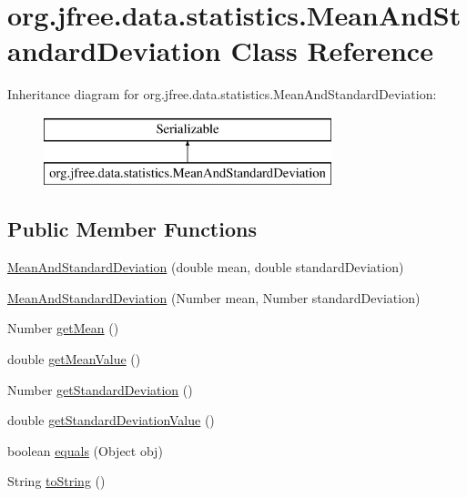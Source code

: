 \hypertarget{classorg_1_1jfree_1_1data_1_1statistics_1_1_mean_and_standard_deviation}{}\section{org.\+jfree.\+data.\+statistics.\+Mean\+And\+Standard\+Deviation Class Reference}
\label{classorg_1_1jfree_1_1data_1_1statistics_1_1_mean_and_standard_deviation}
Inheritance diagram for org.\+jfree.\+data.\+statistics.\+Mean\+And\+Standard\+Deviation\+:\begin{figure}[H]
\begin{center}
\leavevmode
\includegraphics[height=2.000000cm]{classorg_1_1jfree_1_1data_1_1statistics_1_1_mean_and_standard_deviation}
\end{center}
\end{figure}
\subsection*{Public Member Functions}
\begin{DoxyCompactItemize}
\item 
\mbox{\hyperlink{classorg_1_1jfree_1_1data_1_1statistics_1_1_mean_and_standard_deviation_ac1fd9028a4b27e628e6b0c10f63ccd5f}{Mean\+And\+Standard\+Deviation}} (double mean, double standard\+Deviation)
\item 
\mbox{\hyperlink{classorg_1_1jfree_1_1data_1_1statistics_1_1_mean_and_standard_deviation_a74de958caea0910c4c0d18f62108f490}{Mean\+And\+Standard\+Deviation}} (Number mean, Number standard\+Deviation)
\item 
Number \mbox{\hyperlink{classorg_1_1jfree_1_1data_1_1statistics_1_1_mean_and_standard_deviation_a2c1233c0e0fa3ae0307187f122f1fc43}{get\+Mean}} ()
\item 
double \mbox{\hyperlink{classorg_1_1jfree_1_1data_1_1statistics_1_1_mean_and_standard_deviation_af21182a3c89a68ae13833c552feb18d9}{get\+Mean\+Value}} ()
\item 
Number \mbox{\hyperlink{classorg_1_1jfree_1_1data_1_1statistics_1_1_mean_and_standard_deviation_aac392b181dc4e2bdfdd47b7dc6e7ae29}{get\+Standard\+Deviation}} ()
\item 
double \mbox{\hyperlink{classorg_1_1jfree_1_1data_1_1statistics_1_1_mean_and_standard_deviation_a74c3e8989dfc84acedf20eb35849afcf}{get\+Standard\+Deviation\+Value}} ()
\item 
boolean \mbox{\hyperlink{classorg_1_1jfree_1_1data_1_1statistics_1_1_mean_and_standard_deviation_a1525881f5d3fc6576a8b3c55b10eb145}{equals}} (Object obj)
\item 
String \mbox{\hyperlink{classorg_1_1jfree_1_1data_1_1statistics_1_1_mean_and_standard_deviation_a78a81f05f84f3649082fde42a1eda7ad}{to\+String}} ()
\end{DoxyCompactItemize}


